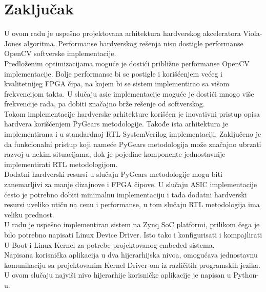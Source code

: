 \section{Zaključak}

U ovom radu je uspešno projektovana arhitektura hardverskog akceleratora
Viola-Jones algoritma.
Performanse hardverskog rešenja nisu dostigle performanse OpenCV softverske
implementacije. \\

Predloženim optimizacijama moguće je dostići približne performanse OpenCV
implementacije.
Bolje performanse bi se postigle i korišćenjem većeg i kvalitetnijeg FPGA čipa,
na kojem bi se sistem implementirao sa višom frekvencijom takta.
U slučaju \gls{asic} implementacije moguće je dostići mnogo više
frekvencije rada, pa dobiti značajno brže rešenje od softverskog. \\

Tokom implementacije hardverske arhitekture korišćen je inovativni pristup opisa
hardvera korišćenjem PyGears metodologije.
Takođe ista arhitektura je implementirana i u standardnoj RTL SystemVerilog
implementaciji.
Zaključeno je da funkcionalni pristup koji nameće PyGears metodologija može
značajno ubrzati razvoj u nekim situacijama, dok je pojedine komponente
jednostavnije implementirati RTL metodologijom. \\
Dodatni hardverski resursi u slučaju PyGears metodologije mogu biti zanemarljivi
za manje dizajnove i FPGA čipove.
U slučaju ASIC implementacije često je potrebno dobiti minimalnu implementaciju i
tada dodatni hardverski resursi uveliko utiču na cenu i performanse, u tom
slučaju RTL metodologija ima veliku prednost. \\

U radu je uspešno implementiran sistem na Zynq SoC platformi, prilikom
čega je bilo potrebno napisati Linux Device Driver.
Isto tako i konfigurisati i kompajlirati U-Boot i Linux Kernel za potrebe
projektovanog embeded sistema. \\
Napisana korisnička aplikacija u dva hijerarhijska nivoa, omogućava jednostavnu
komunikaciju sa projektovanim Kernel Driver-om iz različitih programskih jezika.
U ovom slučaju najviši nivo hijerarhije korisničke aplikacije je napisan u
Python-u. \\